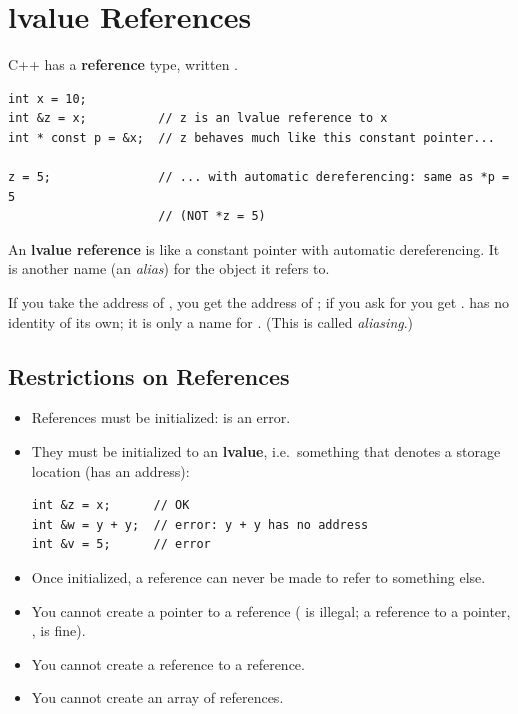 \section{lvalue References}
C++ has a \textbf{reference} type, written \code{\&}.
\begin{lstlisting}[style=cpp]
int x = 10;
int &z = x;          // z is an lvalue reference to x
int * const p = &x;  // z behaves much like this constant pointer...

z = 5;               // ... with automatic dereferencing: same as *p = 5
                     // (NOT *z = 5)
\end{lstlisting}

\begin{definition}
An \textbf{lvalue reference} is like a constant pointer with automatic
dereferencing. It is another name (an \emph{alias}) for the object it refers to.
\end{definition}

\begin{center}
\end{center}

If you take the address of , you get the address of ; if you ask
for  you get .  has no identity of its
own; it is only a name for . (This is called \emph{aliasing}.)

\subsection{Restrictions on References}
\begin{itemize}
  \item References must be initialized:  is an error.
  \item They must be initialized to an \textbf{lvalue}, i.e.\ something that
        denotes a storage location (has an address):
\begin{lstlisting}[style=cpp]
int &z = x;      // OK
int &w = y + y;  // error: y + y has no address
int &v = 5;      // error
\end{lstlisting}
  \item Once initialized, a reference can never be made to refer to something
        else.
  \item You cannot create a pointer to a reference ( is illegal;
        a reference to a pointer, , is fine).
  \item You cannot create a reference to a reference.
  \item You cannot create an array of references.
\end{itemize}

